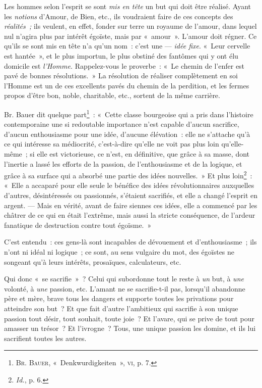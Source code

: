 \documentclass[french,twoside]{book} %
\begin{document}
Les hommes selon l’esprit se sont \emph{mis en tête} un but qui doit être réalisé. Ayant les \emph{notions} d’Amour, de Bien, etc., ils voudraient faire de ces concepts des  \emph{réalités ;} ils veulent, en effet, fonder sur terre un royaume de l’amour, dans lequel nul n’agira plus par intérêt égoïste, mais par « amour ». L’amour doit régner. Ce qu’ils se sont mis en tête n’a qu’un nom : c’est une — \emph{idée fixe}. « Leur cervelle est hantée », et le plus importun, le plus obstiné des fantômes qui y ont élu domicile est \emph{l’Homme.} Rappelez-vous le proverbe : « Le chemin de l’enfer est pavé de bonnes résolutions. » La résolution de réaliser complètement en soi l’Homme est un de ces excellents pavés du chemin de la perdition, et les fermes propos d’être bon, noble, charitable, etc., sortent de la même carrière.\par
Br. Bauer dit quelque part\footnote{ \noindent B{\scshape r}. B{\scshape auer}, « Denkwurdigkeiten », {\scshape vi}, p. 7.
 } : « Cette classe bourgeoise qui a pris dans l’histoire contemporaine une si redoutable importance n’est capable d’aucun sacrifice, d’aucun enthousiasme pour une idée, d’aucune élévation : elle ne s’attache qu’à ce qui intéresse sa médiocrité, c’est-à-dire qu’elle ne voit pas plus loin qu’elle-même ; si elle est victorieuse, ce n’est, en définitive, que grâce à sa masse, dont l’inertie a lassé les efforts de la passion, de l’enthousiasme et de la logique, et grâce à sa surface qui a absorbé une partie des idées nouvelles. » Et plus loin\footnote{ \noindent \emph{Id.}, p. 6.
 } : « Elle a accaparé pour elle seule le bénéfice des idées révolutionnaires auxquelles d’autres, désintéressés ou passionnés, s’étaient sacrifiés, et elle a changé l’esprit en argent. — Mais en vérité, avant de faire siennes ces idées, elle a commencé par les châtrer de ce qui en était l’extrême, mais aussi la stricte conséquence, de l’ardeur fanatique de destruction contre tout égoïsme. »\par
C’est entendu : ces gens-là sont incapables de dévouement et d’enthousiasme ; ils n’ont ni idéal ni logique ; ce sont, au sens vulgaire du mot, des  égoïstes ne songeant qu’à leurs intérêts, prosaïques, calculateurs, etc.\par
Qui donc « se sacrifie » ? Celui qui subordonne tout le reste à \emph{un} but, à \emph{une} volonté, à \emph{une} passion, etc. L’amant ne se sacrifie-t-il pas, lorsqu’il abandonne père et mère, brave tous les dangers et supporte toutes les privations pour atteindre son but ? Et que fait d’autre l’ambitieux qui sacrifie à son unique passion tout désir, tout souhait, toute joie ? Et l’avare, qui se prive de tout pour amasser un trésor ? Et l’ivrogne ? Tous, une unique passion les domine, et ils lui sacrifient toutes les autres.\par
\end{document}
